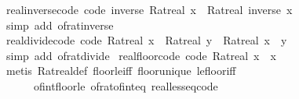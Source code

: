 \begin{isabellebody}
\endisatagproof
{\isafoldproof}%
%
\isadelimproof
\isanewline
%
\endisadelimproof
\isanewline
{}\isamarkupfalse%
\ real{\isacharunderscore}{\kern0pt}inverse{\isacharunderscore}{\kern0pt}code\ {\isacharbrackleft}{\kern0pt}code{\isacharbrackright}{\kern0pt}{\isacharcolon}{\kern0pt}\ {\isachardoublequoteopen}inverse\ {\isacharparenleft}{\kern0pt}Ratreal\ x{\isacharparenright}{\kern0pt}\ {\isacharequal}{\kern0pt}\ Ratreal\ {\isacharparenleft}{\kern0pt}inverse\ x{\isacharparenright}{\kern0pt}{\isachardoublequoteclose}\isanewline
%
\isadelimproof
\ \ %
\endisadelimproof
%
\isatagproof
{}\isamarkupfalse%
\ {\isacharparenleft}{\kern0pt}simp\ add{\isacharcolon}{\kern0pt}\ of{\isacharunderscore}{\kern0pt}rat{\isacharunderscore}{\kern0pt}inverse{\isacharparenright}{\kern0pt}%
\endisatagproof
{\isafoldproof}%
%
\isadelimproof
\isanewline
%
\endisadelimproof
\isanewline
{}\isamarkupfalse%
\ real{\isacharunderscore}{\kern0pt}divide{\isacharunderscore}{\kern0pt}code\ {\isacharbrackleft}{\kern0pt}code{\isacharbrackright}{\kern0pt}{\isacharcolon}{\kern0pt}\ {\isachardoublequoteopen}Ratreal\ x\ {\isacharslash}{\kern0pt}\ Ratreal\ y\ {\isacharequal}{\kern0pt}\ Ratreal\ {\isacharparenleft}{\kern0pt}x\ {\isacharslash}{\kern0pt}\ y{\isacharparenright}{\kern0pt}{\isachardoublequoteclose}\isanewline
%
\isadelimproof
\ \ %
\endisadelimproof
%
\isatagproof
{}\isamarkupfalse%
\ {\isacharparenleft}{\kern0pt}simp\ add{\isacharcolon}{\kern0pt}\ of{\isacharunderscore}{\kern0pt}rat{\isacharunderscore}{\kern0pt}divide{\isacharparenright}{\kern0pt}%
\endisatagproof
{\isafoldproof}%
%
\isadelimproof
\isanewline
%
\endisadelimproof
\isanewline
{}\isamarkupfalse%
\ real{\isacharunderscore}{\kern0pt}floor{\isacharunderscore}{\kern0pt}code\ {\isacharbrackleft}{\kern0pt}code{\isacharbrackright}{\kern0pt}{\isacharcolon}{\kern0pt}\ {\isachardoublequoteopen}{\isasymlfloor}Ratreal\ x{\isasymrfloor}\ {\isacharequal}{\kern0pt}\ {\isasymlfloor}x{\isasymrfloor}{\isachardoublequoteclose}\isanewline
%
\isadelimproof
\ \ %
\endisadelimproof
%
\isatagproof
{}\isamarkupfalse%
\ {\isacharparenleft}{\kern0pt}metis\ Ratreal{\isacharunderscore}{\kern0pt}def\ floor{\isacharunderscore}{\kern0pt}le{\isacharunderscore}{\kern0pt}iff\ floor{\isacharunderscore}{\kern0pt}unique\ le{\isacharunderscore}{\kern0pt}floor{\isacharunderscore}{\kern0pt}iff\isanewline
\ \ \ \ \ \ of{\isacharunderscore}{\kern0pt}int{\isacharunderscore}{\kern0pt}floor{\isacharunderscore}{\kern0pt}le\ of{\isacharunderscore}{\kern0pt}rat{\isacharunderscore}{\kern0pt}of{\isacharunderscore}{\kern0pt}int{\isacharunderscore}{\kern0pt}eq\ real{\isacharunderscore}{\kern0pt}less{\isacharunderscore}{\kern0pt}eq{\isacharunderscore}{\kern0pt}code{\isacharparenright}{\kern0pt}%

\end{isabellebody}
